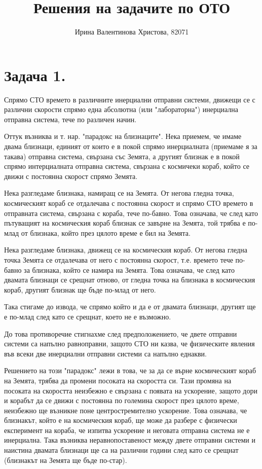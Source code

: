 \documentclass[a4paper,12pt]{article}
\title{Решения на задачите по ОТО}
\author{Ирина Валентинова Христова, 82071}
\begin{document}
\maketitle
\pagebreak
\section*{Задача 1.}
Спрямо СТО времето в различните инерциални отправни системи, движещи се с 
различни скорости спрямо една абсолютна (или "лабораторна") инерциална отправна система,
тече по различен начин.

Оттук възниква и т. нар. "парадокс на близнаците". Нека приемем, че имаме двама близнаци, 
единият от които е в покой спрямо инерциалната (приемаме я за такава) отправна система, свързана
със Земята, а другият близнак е в покой спрямо интерциалната отправна система, свързана 
с космичеки кораб, който се движи с постоянна скорост спрямо Земята.

Нека разгледаме близнака, намиращ се на Земята. От негова гледна точка,
космическият кораб се отдалечава с постоянна скорост и спрямо СТО времето в отправната система, 
свързана с кораба, тече по-бавно. Това означава, че след като пътуващият на космическия кораб близнак се завърне на Земята, 
той трябва е по-млад от близнака, който през цялото време е бил на Земята.

Нека разгледаме близнака, движещ се на космическия кораб. От негова гледна точка Земята се отдалечава от него с постоянна 
скорост, т.е. времето тече по-бавно за близнака, който се намира на Земята. Това означава, че след като двамата близнаци се срещнат отново, 
от гледна точка на близнака в космическия кораб, другият близнак ще бъде по-млад от него.

Така стигаме до извода, че спрямо който и да е от двамата близнаци, другият ще е по-млад след като се срещнат, което не е възможно.

До това противоречие стигнахме след предположението, че двете отправни системи са напълно равноправни, 
защото СТО ни казва, че физическите явления във всеки две инерциални отправни системи са напълно еднакви.

Решението на този "парадокс" лежи в това, че за да се върне космическият кораб на Земята, трябва да промени посоката на скоростта си. 
Тази промяна на посоката на скоростта неизбежно е свързана с появата на ускорение, защото дори и корабът да се движи с постоянна по големина скорост през цялото време, 
неизбежно ще възникне поне центростремително ускорение. Това означава, че близнакът, който е на космическия кораб, ще може да разбере с физически експеримент на кораба, че изпитва ускорение
и неговата отправна система не е инерциална. Така възниква неравнопоставеност между 
двете отправни системи и наистина двамата близнаци ще са на различни години след като се срещнат (близнакът на Земята ще бъде по-стар).
\end{document}
